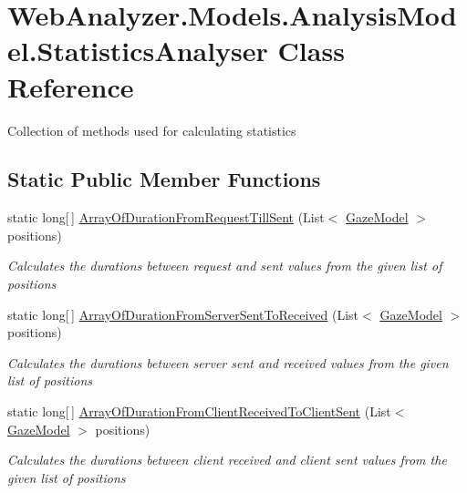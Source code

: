 \hypertarget{class_web_analyzer_1_1_models_1_1_analysis_model_1_1_statistics_analyser}{}\section{Web\+Analyzer.\+Models.\+Analysis\+Model.\+Statistics\+Analyser Class Reference}
\label{class_web_analyzer_1_1_models_1_1_analysis_model_1_1_statistics_analyser}


Collection of methods used for calculating statistics  


\subsection*{Static Public Member Functions}
\begin{DoxyCompactItemize}
\item 
static long\mbox{[}$\,$\mbox{]} \hyperlink{class_web_analyzer_1_1_models_1_1_analysis_model_1_1_statistics_analyser_a0a19416111599cf25b18e2cd862600a9}{Array\+Of\+Duration\+From\+Request\+Till\+Sent} (List$<$ \hyperlink{class_web_analyzer_1_1_models_1_1_data_model_1_1_gaze_model}{Gaze\+Model} $>$ positions)
\begin{DoxyCompactList}\small\item\em Calculates the durations between request and sent values from the given list of positions \end{DoxyCompactList}\item 
static long\mbox{[}$\,$\mbox{]} \hyperlink{class_web_analyzer_1_1_models_1_1_analysis_model_1_1_statistics_analyser_ae555b28e5931d366687c66153cb9cb11}{Array\+Of\+Duration\+From\+Server\+Sent\+To\+Received} (List$<$ \hyperlink{class_web_analyzer_1_1_models_1_1_data_model_1_1_gaze_model}{Gaze\+Model} $>$ positions)
\begin{DoxyCompactList}\small\item\em Calculates the durations between server sent and received values from the given list of positions \end{DoxyCompactList}\item 
static long\mbox{[}$\,$\mbox{]} \hyperlink{class_web_analyzer_1_1_models_1_1_analysis_model_1_1_statistics_analyser_aa360f68023a2d70d0efb9de8e0c9f749}{Array\+Of\+Duration\+From\+Client\+Received\+To\+Client\+Sent} (List$<$ \hyperlink{class_web_analyzer_1_1_models_1_1_data_model_1_1_gaze_model}{Gaze\+Model} $>$ positions)
\begin{DoxyCompactList}\small\item\em Calculates the durations between client received and client sent values from the given list of positions \end{DoxyCompactList}\end{DoxyCompactItemize}


